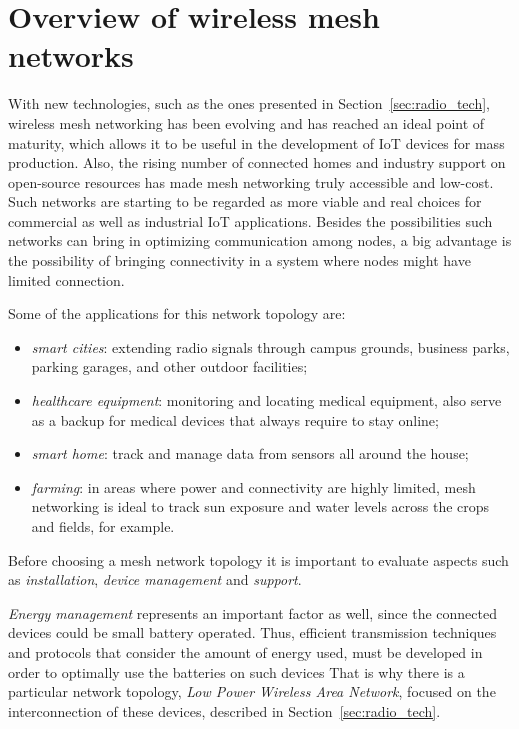 	\section{Overview of wireless mesh networks}\label{sec:overview_wms}
		
		With new technologies, such as the ones presented in Section~\ref{sec:radio_tech}, wireless mesh networking has been evolving and has reached an ideal point of maturity, which allows it to be useful in the development of IoT devices for mass production.
		Also, the rising number of connected homes and industry support on open-source resources has made mesh networking truly accessible and low-cost.
		Such networks are starting to be regarded as more viable and real choices for commercial as well as industrial IoT applications.
		Besides the possibilities such networks can bring in optimizing communication among nodes, a big advantage is the possibility of bringing connectivity in a system where nodes might have limited connection.
		
		Some of the applications for this network topology are:
		\begin{itemize}
			\item \textit{smart cities}: extending radio signals through campus grounds, business parks, parking garages, and other outdoor facilities;
			\item \textit{healthcare equipment}: monitoring and locating medical equipment, also serve as a backup for medical devices that always require to stay online;
			\item \textit{smart home}: track and manage data from sensors all around the house;
			\item \textit{farming}: in areas where power and connectivity are highly limited, mesh networking is ideal to track sun exposure and water levels across the crops and fields, for example.
		\end{itemize}
	
		Before choosing a mesh network topology it is important to evaluate aspects such as \textit{installation}, \textit{device management} and \textit{support}.
	
		\textit{Energy management} represents an important factor as well, since the connected devices could be small battery operated.
		Thus, efficient transmission techniques and protocols that consider the amount of energy used, must be developed in order to optimally use the batteries on such devices		
		That is why there is a particular network topology, \textit{Low Power Wireless Area Network}, focused on the interconnection of these devices, described in Section~\ref{sec:radio_tech}.
		
